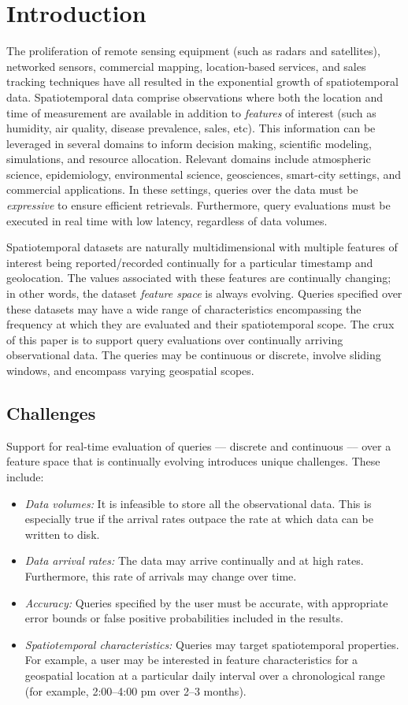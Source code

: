 \section{Introduction}
\label{sec:introduction}
The proliferation of remote sensing equipment (such as radars and satellites), networked sensors, commercial mapping, location-based services, and sales tracking techniques have all resulted in the exponential growth of spatiotemporal data. Spatiotemporal data comprise observations where both the location and time of measurement are available in addition to \emph{features} of interest (such as humidity, air quality, disease prevalence, sales, etc). This information can be leveraged in several domains to inform decision making, scientific modeling, simulations, and resource allocation. Relevant domains include atmospheric science, epidemiology, environmental science, geosciences, smart-city settings, and commercial applications. In these settings, queries over the data must be \emph{expressive} to ensure efficient retrievals. Furthermore, query evaluations must be executed in real time with low latency, regardless of data volumes.

Spatiotemporal datasets are naturally multidimensional with multiple features of interest being reported/recorded continually for a particular timestamp and geolocation. The values associated with these features are continually changing; in other words, the dataset \emph{feature space} is always evolving.  Queries specified over these datasets may have a wide range of characteristics encompassing the frequency at which they are evaluated and their spatiotemporal scope. The crux of this paper is to support query evaluations over continually arriving observational data. The queries may be continuous or discrete, involve sliding windows, and encompass varying geospatial scopes.

\subsection{Challenges}
Support for real-time evaluation of queries --– discrete and continuous --– over a feature space that is continually evolving introduces unique challenges. These include:
\begin{itemize}
    \item   \emph{Data volumes:} It is infeasible to store all the observational data. This is especially true if the arrival rates outpace the rate at which data can be written to disk.
    \item   \emph{Data arrival rates:} The data may arrive continually and at high rates. Furthermore, this rate of arrivals may change over time.
    \item   \emph{Accuracy:} Queries specified by the user must be accurate, with appropriate error bounds or false positive probabilities included in the results.
    \item   \emph{Spatiotemporal characteristics:} Queries may target spatiotemporal properties. For example, a user may be interested in feature characteristics for a geospatial location at a particular daily interval over a chronological range (for example, 2:00--4:00 pm over 2--3 months).
\end{itemize}

